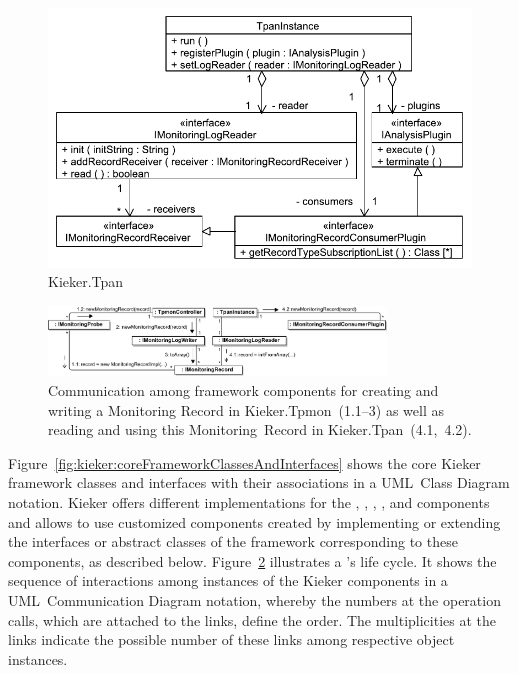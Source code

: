 \begin{figure}\centering
\includegraphics[scale=0.65]{figures/model/kieker_TpanInstance}%
\caption{Kieker.Tpan}
\label{fig:kieker:coreFrameworkClassesAndInterfaces:tpan}
\end{figure}

\begin{figure}\centering
\includegraphics[width=0.8\textwidth]{figures/kiekerCommunications-revisedReArranged-woMonitoringLog-bw}%
\caption{Communication among framework components %
for creating and writing a Monitoring Record in Kieker.Tpmon~(1.1--3) as well as %
reading and using this Monitoring~Record in Kieker.Tpan~(4.1,~4.2). %
}
\label{fig:kieker:communicationsAmongCoreFrameworkComponents}
\end{figure}

Figure~\ref{fig:kieker:coreFrameworkClassesAndInterfaces} shows the core
Kieker framework classes and interfaces with their associations in a UML~Class %
Diagram notation. %
Kieker offers different implementations for the \MonitoringRecord{}, %
\MonitoringProbe{}, \MonitoringLogWriter{}, %
\MonitoringLogReader{}, and \MonitoringRecordConsumer{} %
components and allows to use customized components created by implementing or %
extending the interfaces or abstract classes of the framework corresponding to these components, as described below.
% 
% 
Figure~\ref{fig:kieker:communicationsAmongCoreFrameworkComponents} illustrates a \MonitoringRecord{}'s life cycle. It shows the
sequence of interactions among instances of the
Kieker components in a UML~Communication Diagram
notation, whereby the numbers at the operation calls, which are attached to the links, define the order. The multiplicities at the links indicate the possible number of these links among respective object instances.


